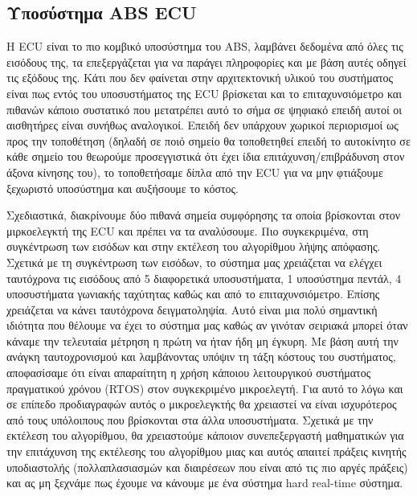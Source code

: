 \documentclass{article}
\begin{document}
\subsection{Υποσύστημα ABS ECU}
H ECU είναι το πιο κομβικό υποσύστημα του ABS, λαμβάνει δεδομένα από όλες τις εισόδους της, τα επεξεργάζεται για να παράγει πληροφορίες και με βάση αυτές οδηγεί τις εξόδους της.
Κάτι που δεν φαίνεται στην αρχιτεκτονική υλικού του συστήματος είναι πως εντός του υποσυστήματος της ECU βρίσκεται και το επιταχυνσιόμετρο και πιθανών κάποιο συστατικό που μετατρέπει αυτό το σήμα σε ψηφιακό επειδή αυτοί οι αισθητήρες είναι συνήθως αναλογικοί. Επειδή δεν υπάρχουν χωρικοί περιορισμοί ως προς την τοποθέτηση (δηλαδή σε ποιό σημείο θα τοποθετηθεί επειδή το αυτοκίνητο σε κάθε σημείο του θεωρούμε προσεγγιστικά ότι έχει ίδια επιτάχυνση/επιβράδυνση στον άξονα κίνησης του), το τοποθετήσαμε δίπλα από την ECU για να μην φτιάξουμε ξεχωριστό υποσύστημα και αυξήσουμε το κόστος.
\par
Σχεδιαστικά, διακρίνουμε δύο πιθανά σημεία συμφόρησης τα οποία βρίσκονται στον μιρκοελεγκτή της ECU και πρέπει να τα αναλύσουμε. Πιο συγκεκριμένα, στη συγκέντρωση των εισόδων και στην εκτέλεση του αλγορίθμου λήψης απόφασης. Σχετικά με τη συγκέντρωση των εισόδων, το σύστημα μας χρειάζεται να ελέγχει ταυτόχρονα τις εισόδους από 5 διαφορετικά υποσυστήματα, 1 υποσύστημα πεντάλ, 4 υποσυστήματα γωνιακής ταχύτητας καθώς και από το επιταχυνσιόμετρο. Επίσης χρειάζεται να κάνει ταυτόχρονα δειγματοληψία. Αυτό είναι μια πολύ σημαντική ιδιότητα που θέλουμε να έχει το σύστημα μας καθώς αν γινόταν σειριακά μπορεί όταν κάναμε την τελευταία μέτρηση η πρώτη να ήταν ήδη μη έγκυρη. Με βάση αυτή την ανάγκη ταυτοχρονισμού και λαμβάνοντας υπόψιν τη τάξη κόστους του συστήματος, αποφασίσαμε ότι είναι απαραίτητη η χρήση κάποιου λειτουργικού συστήματος πραγματικού χρόνου (RTOS) στον συγκεκριμένο μικροελεγτή. Για αυτό το λόγω και σε επίπεδο προδιαγραφών αυτός ο μικροελεγκτής θα χρειαστεί να είναι ισχυρότερος από τους υπόλοιπους που βρίσκονται στα άλλα υποσυστήματα. Σχετικά με την εκτέλεση του αλγορίθμου, θα χρειαστούμε κάποιον συνεπεξεργαστή μαθηματικών για την επιτάχυνση της εκτέλεσης του αλγορίθμου μιας και αυτός απαιτεί πράξεις κινητής υποδιαστολής (πολλαπλασιασμών και διαιρέσεων που είναι από τις πιο αργές πράξεις) και ας μη ξεχνάμε πως έχουμε να κάνουμε με ένα σύστημα hard real-time σύστημα.
\end{document}
